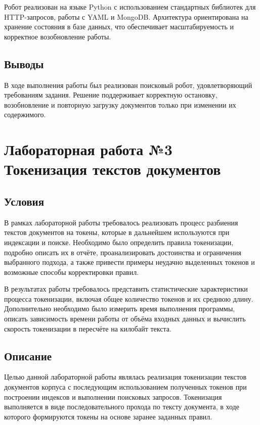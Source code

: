 \documentclass[12pt,a4paper]{article}
\begin{document}
Робот реализован на языке Python с использованием стандартных библиотек для HTTP-запросов, работы с YAML и MongoDB. Архитектура ориентирована на хранение состояния в базе данных, что обеспечивает масштабируемость и корректное возобновление работы.

\subsection*{Выводы}

В ходе выполнения работы был реализован поисковый робот, удовлетворяющий требованиям задания. Решение поддерживает корректную остановку, возобновление и повторную загрузку документов только при изменении их содержимого.

\newpage
\section*{Лабораторная работа №3\\
Токенизация текстов документов}

\subsection*{Условия}

В рамках лабораторной работы требовалось реализовать процесс разбиения текстов документов на токены, которые в дальнейшем используются при индексации и поиске. Необходимо было определить правила токенизации, подробно описать их в отчёте, проанализировать достоинства и ограничения выбранного подхода, а также привести примеры неудачно выделенных токенов и возможные способы корректировки правил.

В результатах работы требовалось представить статистические характеристики процесса токенизации, включая общее количество токенов и их среднюю длину. Дополнительно необходимо было измерить время выполнения программы, описать зависимость времени работы от объёма входных данных и вычислить скорость токенизации в пересчёте на килобайт текста.

\subsection*{Описание}

Целью данной лабораторной работы являлась реализация токенизации текстов документов корпуса с последующим использованием полученных токенов при построении индексов и выполнении поисковых запросов. Токенизация выполняется в виде последовательного прохода по тексту документа, в ходе которого формируются токены на основе заранее заданных правил.
\end{document}
